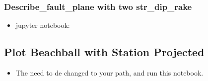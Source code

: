 \documentclass[a4paper,10pt,english,openany]{sphinxmanual}
\begin{document}
\subsubsection{Describe\_fault\_plane with two str\_dip\_rake}
\label{\detokenize{tutorials/S6_Conver_FM:describe-fault-plane-with-two-str-dip-rake}}\begin{itemize}
\item {} 
jupyter notebook:

\begin{sphinxVerbatim}[commandchars=\\\{\}]

  
  
  

  
  
 \PYG{p}{[}\PYG{p}{]}
 \PYG{p}{[}\PYG{p}{]}
\end{sphinxVerbatim}

\end{itemize}


\subsection{Plot Beachball with Station Projected}
\label{\detokenize{tutorials/S7_Plot_Beachball:plot-beachball-with-station-projected}}\label{\detokenize{tutorials/S7_Plot_Beachball::doc}}\begin{itemize}
\item {} 
The  need to de changed to your path, and run this notebook.

\end{itemize}
\end{document}
